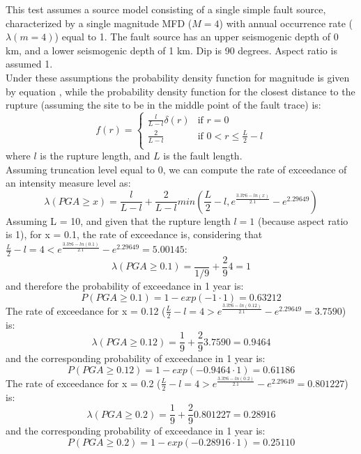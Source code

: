 This test assumes a source model
consisting of a single simple fault source, characterized by a single magnitude
MFD ($M=4$) with annual occurrence rate ($\lambda(m=4)$) equal to 1. The fault
source has an upper seismogenic depth of 0 km, and a lower seismogenic depth of
1 km.  Dip is 90 degrees. Aspect ratio is assumed 1.\\ Under these assumptions
the probability density function for magnitude is given by equation
\label{t1pdfm}, while the probability density function for the closest distance
to the rupture (assuming the site to be in the middle point of the fault trace)
is:
\begin{equation}
f(r) = 
\begin{cases}
\frac{l}{L- l}\delta(r)    &    \text{if } r = 0 \\
\frac{2}{L-l}    &    \text{if } 0 < r \leq \frac{L}{2} - l \\
\end{cases}
\end{equation}
where $l$ is the rupture length, and $L$ is the fault length.\\
Assuming truncation level equal to 0, we can compute the rate of exceedance of an intensity measure level as:
\begin{equation}
\lambda(PGA \geq x) = \frac{l}{L-l} + \frac{2}{L-l}min(\frac{L}{2} - l, e^{\frac{3.376 - ln(x)}{2.1}} - e^{2.29649})
\end{equation}
Assuming L = 10, and given that the rupture length $l=1$ (because aspect ratio is 1), for x = 0.1, the rate of exceedance is,
considering that $\frac{L}{2} - l = 4 < e^{\frac{3.376 - ln(0.1)}{2.1}} - e^{2.29649} = 5.00145$:
\begin{equation}
\lambda(PGA \geq 0.1) = \frac{}{1/9} + \frac{2}{9}4 = 1
\end{equation}
and therefore the probability of exceedance in 1 year is:
\begin{equation}
P(PGA \geq 0.1) = 1 - exp(- 1\cdot 1) = 0.63212
\end{equation}
The rate of exceedance for x = 0.12 ($\frac{L}{2} - l = 4 > e^{\frac{3.376 - ln(0.12)}{2.1}} - e^{2.29649} = 3.7590$) is:
\begin{equation}
\lambda(PGA \geq 0.12) = \frac{1}{9} + \frac{2}{9}3.7590 = 0.9464
\end{equation}
and the corresponding probability of exceedance in 1 year is:
\begin{equation}
P(PGA \geq 0.12) = 1 - exp(- 0.9464 \cdot 1) = 0.61186
\end{equation}
The rate of exceedance for x = 0.2 ($\frac{L}{2} - l = 4 > e^{\frac{3.376 - ln(0.2)}{2.1}} - e^{2.29649} = 0.801227$) is:
\begin{equation}
\lambda(PGA \geq 0.2) = \frac{1}{9} + \frac{2}{9}0.801227 = 0.28916
\end{equation}
and the corresponding probability of exceedance in 1 year is:
\begin{equation}
P(PGA \geq 0.2) = 1 - exp(- 0.28916 \cdot 1) = 0.25110
\end{equation}
%
\clearpage
%
